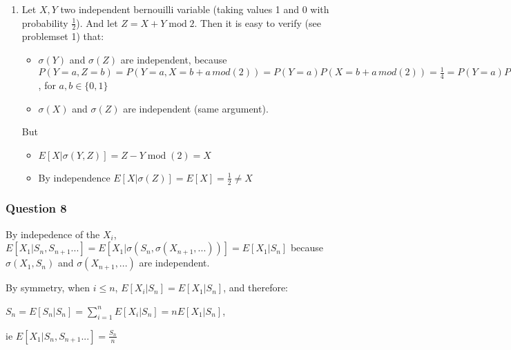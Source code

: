 \documentclass[12pt]{article}
\newcommand{\Q}[1]{\subsubsection*{Question #1}}
\begin{document}
\begin{enumerate}
\item Let $X, Y$ two independent bernouilli variable (taking values 1 and 0 with probability $\frac12$). And let $Z = X + Y \operatorname{mod} 2$. Then it is easy to verify (see problemset 1) that:
  \begin{itemize}
  \item $\sigma(Y)$ and $\sigma(Z)$ are independent, because $P(Y = a, Z = b) = P(Y = a, X = b+a \, mod(2) ) = P(Y = a) P(X = b+a\, mod(2) ) = \frac1 4 = P(Y = a)P(Z = b)$, for $a, b \in \{0, 1\}$
  \item $\sigma(X)$ and $\sigma(Z)$ are independent (same argument).
  \end{itemize}
  But
  \begin{itemize}
  \item $E[X | \sigma(Y,Z)] = Z - Y \operatorname{mod}(2) = X$
  \item By independence $E[X | \sigma(Z)] = E[X] = \frac12 \ne X$ 
  \end{itemize}
  
\end{enumerate}
\Q{8}
By indepedence of the $X_i$, $E[X_1 | S_n, S_{n+1}...] = E[X_1 | \sigma(S_n, \sigma(X_{n+1}, ...))] = E[X_1 | S_n]$ because $\sigma(X_1, S_n)$ and $\sigma(X_{n+1}, ...)$ are independent.

By symmetry, when $i \le n$, $E[X_i|S_n] = E[X_1 | S_n]$, and therefore:

$S_n = E[S_n | S_n] = \sum_{i=1}^n E[X_i | S_n] = n E[X_1 | S_n]$,

ie $E[X_1 | S_n, S_{n+1}...] = \frac{S_n}{n}$
\end{document}
